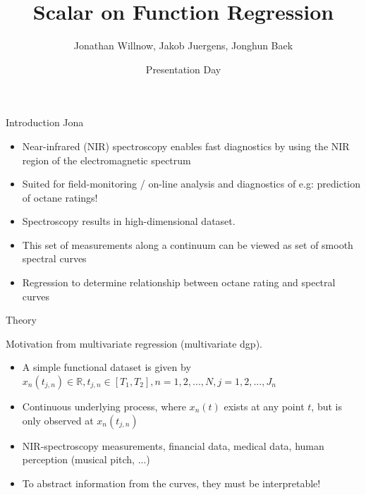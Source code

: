 \documentclass{beamer}
\title{Scalar on Function Regression}
\author{Jonathan Willnow, Jakob Juergens, Jonghun Baek}
\date{{\color{red}}Presentation Day}
\begin{document}
	
	\begin{frame}
		\titlepage 
	\end{frame}
	
	\logo{}
	
	
	\begin{frame}{Introduction}
		Jona \\	
		\begin{itemize}
			\item Near-infrared (NIR) spectroscopy enables fast diagnostics by using the NIR region of the electromagnetic spectrum
			\item Suited for field-monitoring / on-line analysis and diagnostics of e.g: prediction of octane ratings!
			
			\item Spectroscopy results in high-dimensional dataset.
			\item
			This set of measurements along a continuum can be viewed as set of smooth spectral curves
			\item
			Regression to determine relationship between octane rating and spectral curves
			\end{itemize}
	\end{frame}
	
	\begin{frame}{Theory}
		
		Motivation from multivariate regression (multivariate dgp).
		
		\begin{itemize}
			\item
			A simple functional dataset is given by $x_{n}(t_{j,n}) \in \mathbb{R}, t_{j,n} \in [T_1, T_2], n = 1,2,...,N, j = 1,2,..., J_n  $
			\item Continuous underlying process, where $x_n(t)$ exists at any point $t$, but is only observed at $x_{n}(t_{j,n})$
			\item NIR-spectroscopy measurements, financial data, medical data, human perception (musical pitch, ...)
			
			\item To abstract information from the curves, they must be interpretable!
			
			\end{itemize}
	\end{frame}
\end{document}
